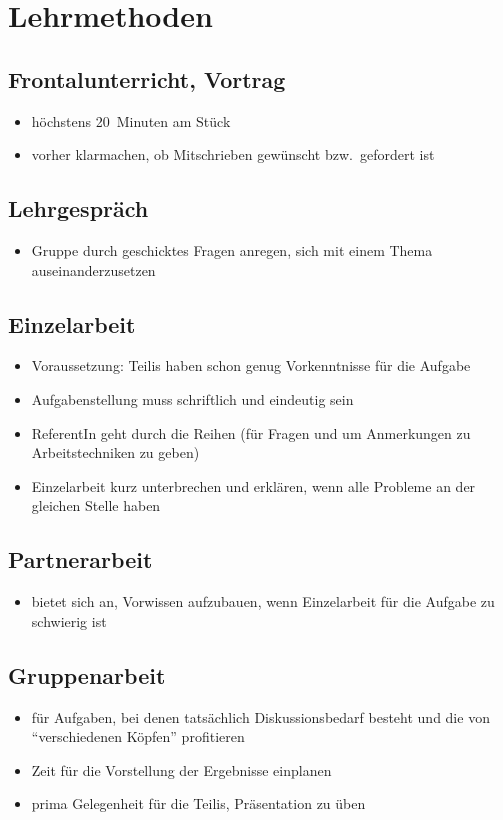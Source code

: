 \chapter{Lehrmethoden}
\label{lehrmethoden}

\section{Frontalunterricht, Vortrag}
\begin{itemize}
 \item höchstens 20~Minuten am Stück
 \item vorher klarmachen, ob Mitschrieben gewünscht bzw.~gefordert ist
\end{itemize}

\section{Lehrgespräch}
\begin{itemize}
 \item Gruppe durch geschicktes Fragen anregen, sich mit einem Thema auseinanderzusetzen
\end{itemize}

\section{Einzelarbeit}
\begin{itemize}
 \item Voraussetzung: Teilis haben schon genug Vorkenntnisse für die Aufgabe
 \item Aufgabenstellung muss schriftlich und eindeutig sein
 \item ReferentIn geht durch die Reihen (für Fragen und um Anmerkungen zu Arbeitstechniken zu geben)
 \item Einzelarbeit kurz unterbrechen und erklären, wenn alle Probleme an der gleichen Stelle haben
\end{itemize}

\section{Partnerarbeit}
\begin{itemize}
 \item bietet sich an, Vorwissen aufzubauen, wenn Einzelarbeit für die Aufgabe zu schwierig ist
\end{itemize}

\section{Gruppenarbeit}
\begin{itemize}
 \item für Aufgaben, bei denen tatsächlich Diskussionsbedarf besteht und die von ``verschiedenen Köpfen'' profitieren
 \item Zeit für die Vorstellung der Ergebnisse einplanen
 \item prima Gelegenheit für die Teilis, Präsentation zu üben
\end{itemize}

